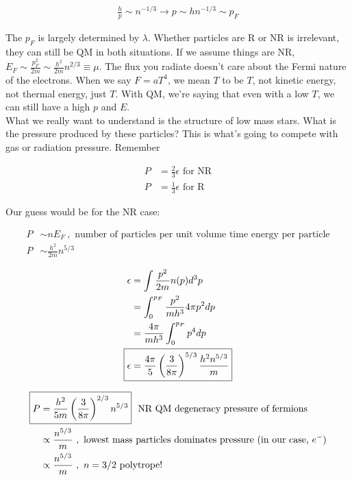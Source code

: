 \begin{align}
\frac{h}{p}\sim n^{-1/3} \rightarrow p \sim hn^{-1/3} \sim p_F
\end{align}

The $p_F$ is largely determined by $\lambda$. Whether particles are R or NR is irrelevant, they can still be QM in both situations. If we assume things are NR, $E_F \sim \frac{p_F^2}{2m		} \sim \frac{h^2}{2m} n^{2/3} \equiv \mu$. The flux you radiate doesn't care about the Fermi nature of the electrons. When we say $F = aT^4$, we mean $T$ to be $T$, not kinetic energy, not thermal energy, just $T$. With QM, we're saying that even with a low $T$, we can still have a high $p$ and $E$. \\

What we really want to understand is the structure of low mass stars. What is the pressure produced by these particles? This is what's going to compete with gas or radiation pressure. Remember

\begin{align}
P &= \frac{2}{3} \epsilon\text{ for NR} \\
P &= \frac{1}{3} \epsilon \text{ for R}
\end{align}

Our guess would be for the NR case:

\begin{align}
P  &\sim n E_F~,\text{ number of particles per unit volume time energy per particle}\\
P &\sim \frac{h^2}{2m}n^{5/3}
\end{align}

\begin{align}
\epsilon &= \int \frac{p^2}{2m}n(p) d^3p\\
&= \int_0^{p_F} \frac{p^2}{mh^3}4 \pi p^2 dp \\
&= \frac{4 \pi}{mh^3} \int_0^{p_F} p^4 dp\\
\Aboxed{\epsilon &= \frac{4 \pi}{5} \lp \frac{3}{8 \pi} \rp^{5/3} \frac{h^2 n^{5/3}}{m}}
\end{align}

\begin{align}
\Aboxed{P &= \frac{h^2}{5m} \lp \frac{3}{8 \pi} \rp^{2/3} n^{5/3}}~\text{ NR QM degeneracy pressure of fermions}\\
&\pt \frac{n^{5/3}}{m}~,\text{ lowest mass particles dominates pressure (in our case, $e^-$)}\\
&\pt \frac{n^{5/3}}{m}~,\text{ $n=3/2$ polytrope!}
\end{align}


